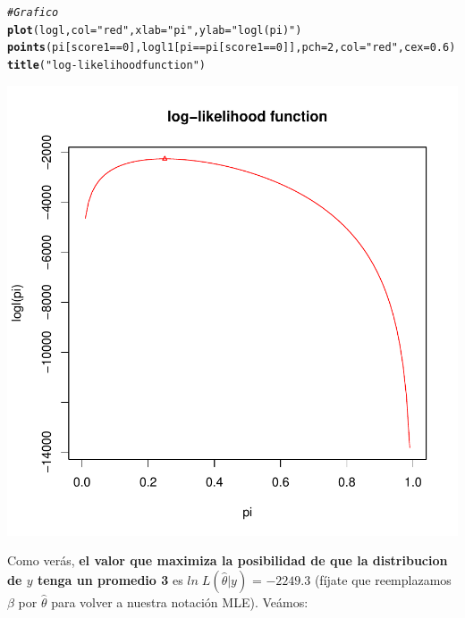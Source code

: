 \documentclass[onesided]{article}\usepackage[]{graphicx}\usepackage[]{color}
\makeatletter
\def\maxwidth{ %
  \ifdim\Gin@nat@width>\linewidth
    \linewidth
  \else
    \Gin@nat@width
  \fi
}
\newcommand{\hlnum}[1]{\textcolor[rgb]{0.686,0.059,0.569}{#1}}%
\newcommand{\hlstr}[1]{\textcolor[rgb]{0.192,0.494,0.8}{#1}}%
\newcommand{\hlcom}[1]{\textcolor[rgb]{0.678,0.584,0.686}{\textit{#1}}}%
\newcommand{\hlopt}[1]{\textcolor[rgb]{0,0,0}{#1}}%
\newcommand{\hlstd}[1]{\textcolor[rgb]{0.345,0.345,0.345}{#1}}%
\newcommand{\hlkwc}[1]{\textcolor[rgb]{0.333,0.667,0.333}{#1}}%
\newcommand{\hlkwd}[1]{\textcolor[rgb]{0.737,0.353,0.396}{\textbf{#1}}}%
\newenvironment{kframe}{%
 \def\at@end@of@kframe{}%
 \ifinner\ifhmode%
  \def\at@end@of@kframe{\end{minipage}}%
  \begin{minipage}{\columnwidth}%
 \fi\fi%
 \def\FrameCommand##1{\hskip\@totalleftmargin \hskip-\fboxsep
 \colorbox{shadecolor}{##1}\hskip-\fboxsep
     \hskip-\linewidth \hskip-\@totalleftmargin \hskip\columnwidth}%
 \MakeFramed {\advance\hsize-\width
   \@totalleftmargin\z@ \linewidth\hsize
   \@setminipage}}%
 {\par\unskip\endMakeFramed%
 \at@end@of@kframe}
\newenvironment{knitrout}{}{} %
\makeatother
\begin{document}
\begin{knitrout}
\color{fgcolor}\begin{kframe}
\begin{alltt}
\hlcom{# Grafico}
\hlkwd{plot}\hlstd{(logl,} \hlkwc{col}\hlstd{=}\hlstr{"red"}\hlstd{,}\hlkwc{xlab}\hlstd{=}\hlstr{"pi"}\hlstd{,}\hlkwc{ylab}\hlstd{=}\hlstr{"logl(pi)"}\hlstd{)}
\hlkwd{points}\hlstd{(pi[score1}\hlopt{==}\hlnum{0}\hlstd{],logl1[pi}\hlopt{==}\hlstd{pi[score1}\hlopt{==}\hlnum{0}\hlstd{]],}\hlkwc{pch}\hlstd{=}\hlnum{2}\hlstd{,}\hlkwc{col}\hlstd{=}\hlstr{"red"}\hlstd{,}\hlkwc{cex}\hlstd{=}\hlnum{0.6}\hlstd{)}
\hlkwd{title}\hlstd{(}\hlstr{"log-likelihood function"}\hlstd{)}
\end{alltt}
\end{kframe}

{\centering \includegraphics[width=\maxwidth]{figure/ll:p-1} 

}



\end{knitrout}

Como ver\'as, {\bf el valor que maximiza la posibilidad de que la distribucion de $y$ tenga un promedio 3} es $ln \; L(\hat\theta|y)$ = $-2249.3$ (f\'ijate que reemplazamos $\beta$ por $\hat\theta$ para volver a nuestra notaci\'on MLE). Ve\'amos:
\end{document}
